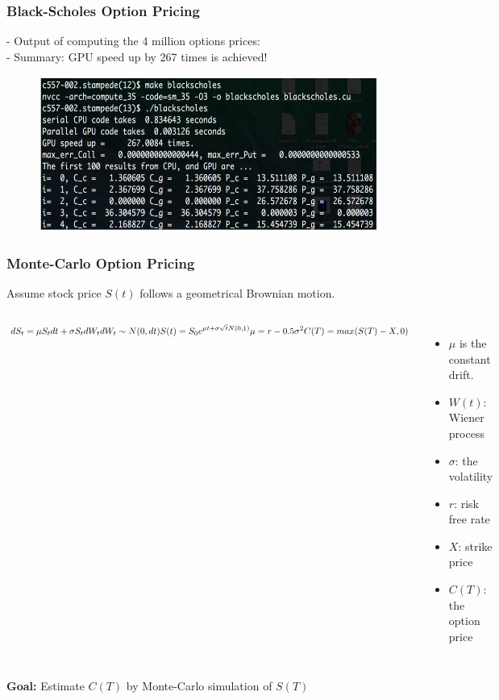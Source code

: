 \documentclass[xcolor={x11names,svgnames,dvipsnames}]{beamer}
\begin{document}
\begin{frame}
\frametitle{Black-Scholes Option Pricing}
- Output of computing the 4 million options prices:\\
- Summary: GPU speed up by 267 times is achieved!\\
 \begin{figure}
     \includegraphics[width=1\textwidth, height=0.6\textheight]{speed.png}
\end{figure}

\end{frame}

\begin{frame}
\frametitle{Monte-Carlo Option Pricing}
Assume stock price $S(t)$ follows a geometrical Brownian motion.

\begin{columns}
\column{2.4in}
\begin{center}
\begin{equation*}
dS_t = \mu S_t dt + \sigma S_t dW_t\\
dW_t \sim N(0, dt )\\
S(t) = S_0 e ^{\mu t + \sigma \sqrt{t}N(0,1)}\\
\mu = r- 0.5 \sigma^2\\
C(T) = max (S(T) - X, 0 ) 
\end{equation*}
\end{center}
\column{2.5in}
\begin{itemize}
\item $\mu$ is the constant drift.
\item $W(t)$: Wiener process
\item $\sigma$: the volatility
\item $r$: risk free rate
\item $X$: strike price
\item $C(T)$: the option price
\end{itemize}
\end{columns}
\textbf{Goal:} Estimate $C(T)$ by Monte-Carlo simulation of $S(T)$
\end{frame}
\end{document}
